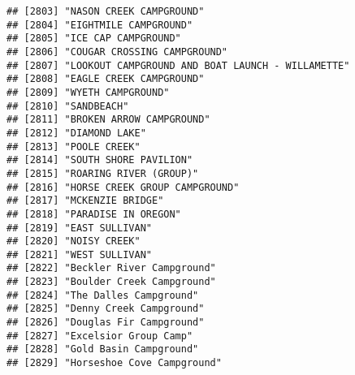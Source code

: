 \documentclass[
]{article}
\begin{document}
\begin{verbatim}
## [2803] "NASON CREEK CAMPGROUND"                                                              
## [2804] "EIGHTMILE CAMPGROUND"                                                                
## [2805] "ICE CAP CAMPGROUND"                                                                  
## [2806] "COUGAR CROSSING CAMPGROUND"                                                          
## [2807] "LOOKOUT CAMPGROUND AND BOAT LAUNCH - WILLAMETTE"                                     
## [2808] "EAGLE CREEK CAMPGROUND"                                                              
## [2809] "WYETH CAMPGROUND"                                                                    
## [2810] "SANDBEACH"                                                                           
## [2811] "BROKEN ARROW CAMPGROUND"                                                             
## [2812] "DIAMOND LAKE"                                                                        
## [2813] "POOLE CREEK"                                                                         
## [2814] "SOUTH SHORE PAVILION"                                                                
## [2815] "ROARING RIVER (GROUP)"                                                               
## [2816] "HORSE CREEK GROUP CAMPGROUND"                                                        
## [2817] "MCKENZIE BRIDGE"                                                                     
## [2818] "PARADISE IN OREGON"                                                                  
## [2819] "EAST SULLIVAN"                                                                       
## [2820] "NOISY CREEK"                                                                         
## [2821] "WEST SULLIVAN"                                                                       
## [2822] "Beckler River Campground"                                                            
## [2823] "Boulder Creek Campground"                                                            
## [2824] "The Dalles Campground"                                                               
## [2825] "Denny Creek Campground"                                                              
## [2826] "Douglas Fir Campground"                                                              
## [2827] "Excelsior Group Camp"                                                                
## [2828] "Gold Basin Campground"                                                               
## [2829] "Horseshoe Cove Campground"                                                           

\end{verbatim}
\end{document}
